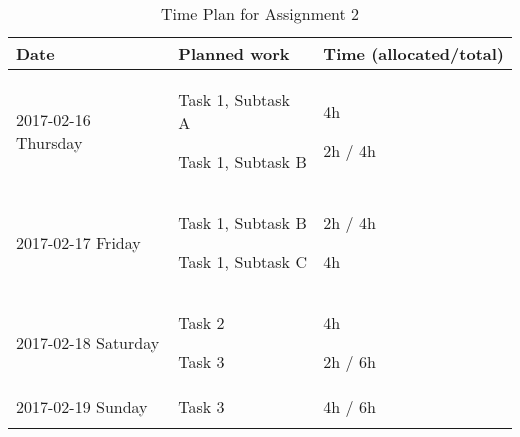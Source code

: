 \begin{longtable}[c]{@{}lll@{}}
\toprule
\begin{minipage}[b]{0.28\columnwidth}\raggedright\strut
Date
\strut\end{minipage} &
\begin{minipage}[b]{0.25\columnwidth}\raggedright\strut
Planned work
\strut\end{minipage} &
\begin{minipage}[b]{0.32\columnwidth}\raggedright\strut
Time (allocated/total)
\strut\end{minipage}\tabularnewline
\midrule
\endhead
\begin{minipage}[t]{0.28\columnwidth}\raggedright\strut
2017-02-16 Thursday
\strut\end{minipage} &
\begin{minipage}[t]{0.25\columnwidth}\raggedright\strut
Task 1, Subtask A

Task 1, Subtask B
\strut\end{minipage} &
\begin{minipage}[t]{0.32\columnwidth}\raggedright\strut
4h

2h / 4h
\strut\end{minipage}\tabularnewline
\begin{minipage}[t]{0.28\columnwidth}\raggedright\strut
2017-02-17 Friday
\strut\end{minipage} &
\begin{minipage}[t]{0.25\columnwidth}\raggedright\strut
Task 1, Subtask B

Task 1, Subtask C
\strut\end{minipage} &
\begin{minipage}[t]{0.32\columnwidth}\raggedright\strut
2h / 4h

4h
\strut\end{minipage}\tabularnewline
\begin{minipage}[t]{0.28\columnwidth}\raggedright\strut
2017-02-18 Saturday
\strut\end{minipage} &
\begin{minipage}[t]{0.25\columnwidth}\raggedright\strut
Task 2

Task 3
\strut\end{minipage} &
\begin{minipage}[t]{0.32\columnwidth}\raggedright\strut
4h

2h / 6h
\strut\end{minipage}\tabularnewline
\begin{minipage}[t]{0.28\columnwidth}\raggedright\strut
2017-02-19 Sunday
\strut\end{minipage} &
\begin{minipage}[t]{0.25\columnwidth}\raggedright\strut
Task 3
\strut\end{minipage} &
\begin{minipage}[t]{0.32\columnwidth}\raggedright\strut
4h / 6h
\strut\end{minipage}\tabularnewline
\bottomrule
  \caption{Time Plan for Assignment 2}
  \label{table-timeplan}
\end{longtable}




